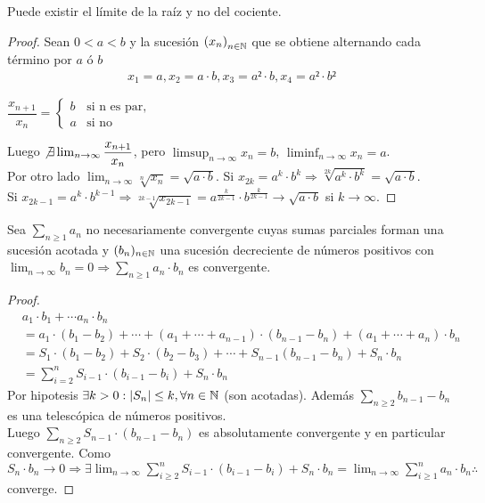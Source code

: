 \begin{eg}
  Puede existir el límite de la raíz y no del cociente.
  \begin{proof}
    Sean \(0 < a < b\) y la sucesión \({(x_n)}_{n \in \mathbb{N}} \) que se obtiene alternando cada término por \(a\) ó \(b\) \begin{align*}
      x_1 = a, x_2 = a \cdot b, x_3 = a² \cdot b, x_4 = a² \cdot b²
    \end{align*}

    \(\dfrac{x_{n+1}}{x_n} = \begin{cases}
        b & \text{si n es par}, \\
        a & \text{si no}
      \end{cases} \)

    Luego \(\not \exists \lim_{n \to \infty} \dfrac{x_{n+1}}{x_n} \), pero \(\limsup_{n \to \infty} x_n = b\), \(\liminf_{n \to \infty} x_n = a\). \\
    Por otro lado \(\lim_{n \to \infty} \sqrt[n]{x_n} = \sqrt{a \cdot b} \). Si \(x_{2k} = a^k \cdot b^k \Rightarrow \sqrt[2k]{a^k \cdot b^k} = \sqrt{a \cdot b} \). \\
    Si \(x_{2k-1} = a^k \cdot b^{k-1} \Rightarrow \sqrt[2k-1]{x_{2k-1}} = a^{\frac{k}{2k-1}} \cdot b^{\frac{k}{2k-1}} \to \sqrt{a \cdot b} \) si \(k \to \infty\).
  \end{proof}
\end{eg}

\begin{theorem}[Dirichlet]
  Sea \(\sum_{n \geq 1} a_n\) no necesariamente convergente cuyas sumas parciales forman una sucesión acotada y \((b_n)_{n \in \mathbb{N}} \) una sucesión decreciente de números positivos con \(\lim_{n \to \infty} b_n = 0 \Rightarrow \sum_{n \geq 1} a_n \cdot b_n\) es convergente.

  \begin{proof}
    \begin{align*}
       & a_1 \cdot b_1 + \cdots a_n \cdot b_n                                                                                \\
       & = a_1 \cdot (b_1 - b_2) +  \cdots + (a_1 + \cdots + a_{n-1}) \cdot (b_{n-1} - b_n) + (a_1 + \cdots + a_n) \cdot b_n \\
       & = S_1 \cdot (b_1 - b_2) + S_2 \cdot (b_2 - b_3) + \cdots + S_{n-1} (b_{n-1} - b_n) + S_n \cdot b_n                  \\
       & = \sum_{i = 2}^n S_{i-1} \cdot (b_{i-1} - b_i) + S_n \cdot b_n
    \end{align*}
    Por hipotesis \(\exists k > 0 : |S_n| \leq k, \forall n \in \mathbb{N} \) (son acotadas). Además \(\sum_{n \geq 2} b_{n-1} - b_n\) es una telescópica de números positivos. \\
    Luego \(\sum_{n \geq 2} S_{n-1} \cdot (b_{n-1} - b_n)\) es absolutamente convergente y en particular convergente.
    Como \(S_n \cdot b_n \to 0 \Rightarrow \exists \lim_{n \to \infty} \sum_{i \geq 2}^n S_{i-1} \cdot (b_{i-1} - b_i) + S_n \cdot b_n = \lim_{n \to \infty} \sum_{i \geq 1}^n a_n \cdot b_n \therefore \) converge.
  \end{proof}
\end{theorem}

